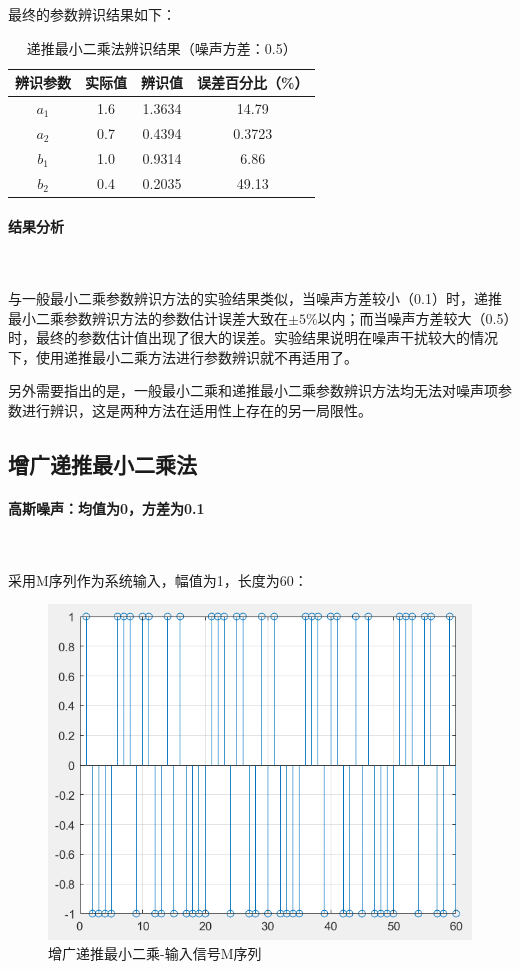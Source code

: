 \documentclass[UTF8]{article}
\begin{document}
最终的参数辨识结果如下：
\begin{table}[H]
\centering %
\begin{tabular}{cccc} %
    \toprule %
    辨识参数 & 实际值 & 辨识值 & 误差百分比（\%） \\
    \midrule %
    $a_1$ & 1.6 & 1.3634 & 14.79 \\
    $a_2$ & 0.7 & 0.4394 & 0.3723 \\
    $b_1$ & 1.0 & 0.9314 & 6.86 \\
    $b_2$ & 0.4 & 0.2035 & 49.13 \\
    \bottomrule %
\end{tabular}
\caption{递推最小二乘法辨识结果（噪声方差：0.5）} %
\end{table}

\paragraph{结果分析}~{}

与一般最小二乘参数辨识方法的实验结果类似，当噪声方差较小（0.1）时，递推最小二乘参数辨识方法的参数估计误差大致在$\pm 5\%$以内；而当噪声方差较大（0.5）时，最终的参数估计值出现了很大的误差。实验结果说明在噪声干扰较大的情况下，使用递推最小二乘方法进行参数辨识就不再适用了。

另外需要指出的是，一般最小二乘和递推最小二乘参数辨识方法均无法对噪声项参数进行辨识，这是两种方法在适用性上存在的另一局限性。

\subsection{增广递推最小二乘法}
\paragraph{高斯噪声：均值为0，方差为0.1}~{}

采用M序列作为系统输入，幅值为1，长度为60：
\begin{figure}[H]
    \centering %
    \includegraphics[width=.8\textwidth]{figure/增广递推最小二乘-输入信号M序列.png} 
    \caption{增广递推最小二乘-输入信号M序列} %
\end{figure}
\end{document}
